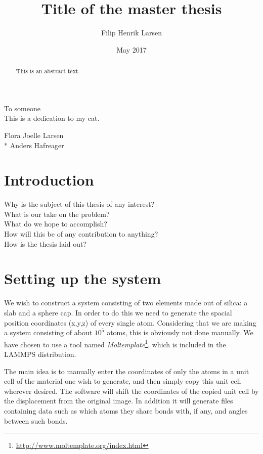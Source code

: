 \documentclass[twoside,english]{uiofysmaster}
\author{Filip Henrik Larsen}
\title{Title of the master thesis}
\date{May 2017}
\begin{document}
\maketitle

\begin{abstract}
This is an abstract text.
\end{abstract}

\begin{dedication}
  To someone
  \\\vspace{12pt}
  This is a dedication to my cat.
\end{dedication}

\begin{acknowledgements}
  Flora Joelle Larsen\\*
  Anders Hafreager
\end{acknowledgements}

\tableofcontents

\chapter{Introduction}

Why is the subject of this thesis of any interest?\\
What is our take on the problem?\\
What do we hope to accomplish?\\
How will this be of any contribution to anything?\\
How is the thesis laid out?

\chapter{Setting up the system}
We wish to construct a system consisting of {\color{red} two} elements made out of silica: a slab and a sphere cap. In order to do this we need to generate the spacial position coordinates (x,y,z) of every single atom. Considering that we are making a system consisting of about $10^5$ atoms, this is obviously not done manually. We have chosen to use a tool named \textit{Moltemplate}\footnote{\href{http://www.moltemplate.org/index.html}{http://www.moltemplate.org/index.html}}, which is included in the LAMMPS distribution.

The main idea is to manually enter the coordinates of only the atoms in a unit cell of the material one wish to generate, and then simply copy this unit cell wherever desired. The software will shift the coordinates of the copied unit cell by the displacement from the original image. In addition it will generate files containing data such as which atoms they share bonds with, if any, and angles between such bonds. 
\end{document}
